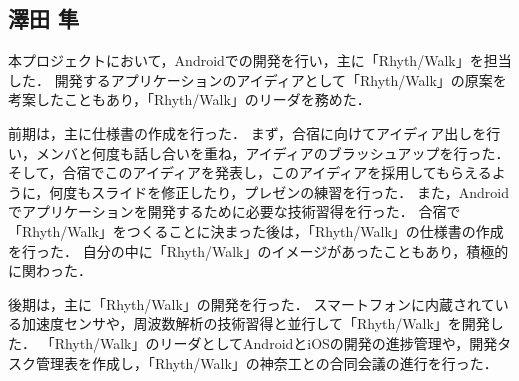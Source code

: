 \subsection{澤田 隼}
\par
本プロジェクトにおいて，Androidでの開発を行い，主に「Rhyth/Walk」を担当した．
開発するアプリケーションのアイディアとして「Rhyth/Walk」の原案を考案したこともあり，「Rhyth/Walk」のリーダを務めた．
\par
前期は，主に仕様書の作成を行った．
まず，合宿に向けてアイディア出しを行い，メンバと何度も話し合いを重ね，アイディアのブラッシュアップを行った．
そして，合宿でこのアイディアを発表し，このアイディアを採用してもらえるように，何度もスライドを修正したり，プレゼンの練習を行った．
また，Androidでアプリケーションを開発するために必要な技術習得を行った．
合宿で「Rhyth/Walk」をつくることに決まった後は，「Rhyth/Walk」の仕様書の作成を行った．
自分の中に「Rhyth/Walk」のイメージがあったこともあり，積極的に関わった．
\par
後期は，主に「Rhyth/Walk」の開発を行った．
スマートフォンに内蔵されている加速度センサや，周波数解析の技術習得と並行して「Rhyth/Walk」を開発した．
「Rhyth/Walk」のリーダとしてAndroidとiOSの開発の進捗管理や，開発タスク管理表を作成し，「Rhyth/Walk」の神奈工との合同会議の進行を行った．

